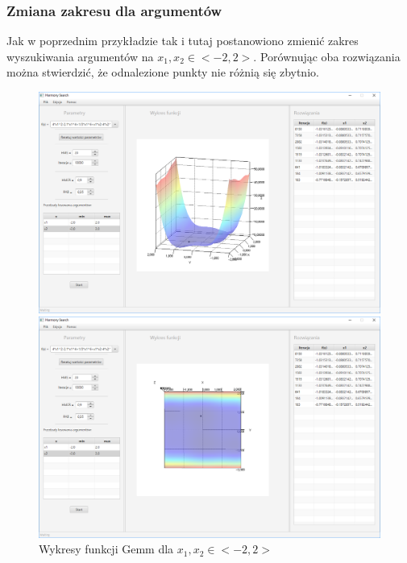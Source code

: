 \documentclass[10pt, a4paper]{article}
\begin{document}
\subsubsection{Zmiana zakresu dla argumentów}
\label{subsubsec:gemm2}
Jak w poprzednim przykładzie tak i tutaj postanowiono zmienić zakres wyszukiwania argumentów na $x_{1}, x_{2} \in <-2,2>$. Porównując oba rozwiązania można stwierdzić, że odnalezione punkty nie różnią się zbytnio.  
\begin{figure}[htbp] 
	\begin{minipage}[b]{.5\textwidth}
		\centering
		\includegraphics[width=\linewidth]{images/22.PNG} 
	\end{minipage} 
	\begin{minipage}[b]{.5\textwidth}
		\centering
		\includegraphics[width=\linewidth]{images/23.PNG} 
	\end{minipage}
	\label{fig:22}
	\caption{Wykresy funkcji Gemm dla $x_{1}, x_{2} \in <-2,2>$}
\end{figure}
\end{document}
